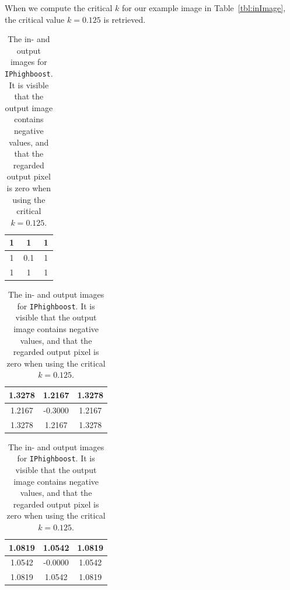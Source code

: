 When we compute the critical \(k\) for our example image in Table~\ref{tbl:inImage}, the critical value \(k = 0.125\) is retrieved.

\begin{table}[h]
  \begin{minipage}[b]{.2\linewidth}
    \centering
    \begin{tabular}{|c|c|c|}\hline
    1 & 1 & 1 \\ \hline
    1 & 0.1 & 1 \\ \hline
    1 & 1 & 1 \\ \hline
    \end{tabular}
    \label{tbl:inImage}
  \end{minipage}
  \hfill
  \begin{minipage}[b]{.3\linewidth}
    \centering
    \begin{tabular}{|c|c|c|}\hline
      1.3278 & 1.2167 & 1.3278 \\ \hline
      1.2167 & -0.3000 & 1.2167 \\ \hline
      1.3278 & 1.2167 & 1.3278 \\ \hline
    \end{tabular}
    \label{tbl:outImage}
  \end{minipage}
  \hfill
  \begin{minipage}[b]{.4\linewidth}
    \centering
    \begin{tabular}{|c|c|c|}\hline
      1.0819 & 1.0542 & 1.0819 \\ \hline
      1.0542 & -0.0000 & 1.0542 \\ \hline
      1.0819 & 1.0542 & 1.0819 \\ \hline
    \end{tabular}
    \label{tbl:criticalImage}
  \end{minipage}
  \caption{The in- and output images for \texttt{IPhighboost}. It is visible that the output image contains negative values, and that the regarded output pixel is zero when using the critical \(k=0.125\).}
  \hfill
\end{table}
\clearpage